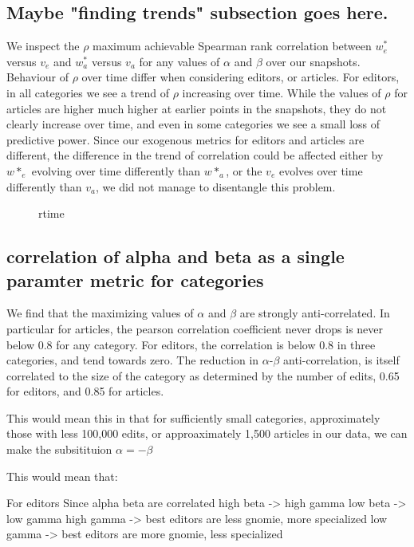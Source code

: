 \documentclass{acm_proc_article-sp}
\begin{document}
\subsection{Maybe "finding trends" subsection goes here.}
We inspect the $\rho$ maximum achievable  Spearman rank correlation between $w^*_e$ versus $v_e$ and $w^*_a$ versus $v_a$ for any values of $\alpha$ and $\beta$ over our snapshots. Behaviour of $\rho$ over time differ when considering editors, or articles. For editors, in all categories we see a trend of $\rho$ increasing over time. While the values of $\rho$ for articles are higher much higher at earlier points in the snapshots, they do not clearly increase over time, and even in some categories we see a small loss of predictive power. Since our exogenous metrics for editors and articles are different, the difference in the trend of correlation could be affected either by $w*_e$ evolving over time differently than $w*_a$, or the $v_e$ evolves over time differently than $v_a$, we did not manage to disentangle this problem.

\begin{figure}[!t]
\centering
\caption{rtime}
\label{fig:rtime}
\end{figure}

\subsection{correlation of alpha and beta as a single paramter metric for categories}


We find that the maximizing values of $\alpha$ and $\beta$ are strongly anti-correlated. In particular for articles, the pearson correlation coefficient never drops is never below 0.8 for any category. For editors, the correlation is below 0.8 in three categories, and tend towards zero. The reduction in $\alpha$-$\beta$ anti-correlation, is itself correlated to the size of the category as determined by the number of edits, 0.65 for editors, and 0.85 for articles. 

This would mean this in that for sufficiently small categories, approximately those with less  100,000 edits, or approaximately 1,500 articles in our data, we can make the subsitituion $\alpha = - \beta$


This would mean that:

For editors
Since alpha beta are correlated 
high beta -> high gamma
low beta -> low gamma
high gamma -> best editors are less gnomie, more specialized
low gamma -> best editors are more gnomie, less specialized
\end{document}
